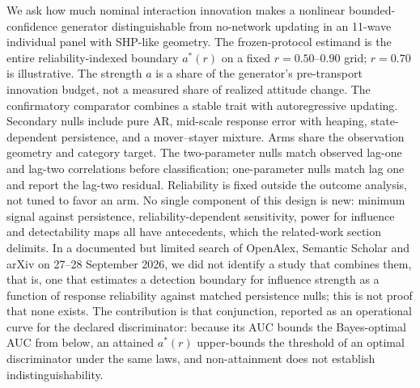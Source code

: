 We ask how much nominal interaction innovation makes a nonlinear bounded-confidence generator distinguishable from no-network updating in an 11-wave individual panel with SHP-like geometry. The frozen-protocol estimand is the entire reliability-indexed boundary $a^{*}(r)$ on a fixed $r=0.50$--$0.90$ grid; $r=0.70$ is illustrative. The strength $a$ is a share of the generator's pre-transport innovation budget, not a measured share of realized attitude change. The confirmatory comparator combines a stable trait with autoregressive updating. Secondary nulls include pure AR, mid-scale response error with heaping, state-dependent persistence, and a mover--stayer mixture. Arms share the observation geometry and category target. The two-parameter nulls match observed lag-one and lag-two correlations before classification; one-parameter nulls match lag one and report the lag-two residual. Reliability is fixed outside the outcome analysis, not tuned to favor an arm.
No single component of this design is new: minimum signal against persistence, reliability-dependent sensitivity, power for influence and detectability maps all have antecedents, which the related-work section delimits.
In a documented but limited search of OpenAlex, Semantic Scholar and arXiv on 27--28 September 2026, we did not identify a study that combines them, that is, one that estimates a detection boundary for influence strength as a function of response reliability against matched persistence nulls; this is not proof that none exists.
The contribution is that conjunction, reported as an operational curve for the declared discriminator: because its AUC bounds the Bayes-optimal AUC from below, an attained $a^{*}(r)$ upper-bounds the threshold of an optimal discriminator under the same laws, and non-attainment does not establish indistinguishability.
